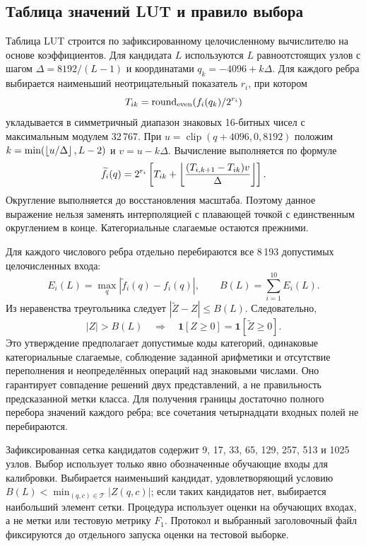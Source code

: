 \subsection{Таблица значений LUT и правило выбора}
\label{sec:lut}
Таблица LUT строится по зафиксированному целочисленному вычислителю на основе коэффициентов. Для кандидата $L$ используются $L$ равноотстоящих узлов с шагом $\Delta=8192/(L-1)$ и координатами $q_k=-4096+k\Delta$. Для каждого ребра выбирается наименьший неотрицательный показатель $r_i$, при котором
\begin{equation}
T_{ik}=\operatorname{round}_{\rm even}(f_i(q_k)/2^{r_i})
\end{equation}
укладывается в симметричный диапазон знаковых 16-битных чисел с максимальным модулем 32\,767. При $u=\operatorname{clip}(q+4096,0,8192)$ положим $k=\min(\left\lfloor u/\Delta\right\rfloor,L-2)$ и $v=u-k\Delta$. Вычисление выполняется по формуле
\begin{equation}
\widetilde f_i(q)=2^{r_i}\left[T_{ik}+\left\lfloor \frac{(T_{i,k+1}-T_{ik})v}{\Delta}\right\rfloor\right].
\label{eq:lut}
\end{equation}
Округление выполняется до восстановления масштаба. Поэтому данное выражение нельзя заменять интерполяцией с плавающей точкой с единственным округлением в конце. Категориальные слагаемые остаются прежними.

Для каждого числового ребра отдельно перебираются все 8\,193 допустимых целочисленных входа:
\begin{equation}
E_i(L)=\max_q|\widetilde f_i(q)-f_i(q)|,\qquad
B(L)=\sum_{i=1}^{10}E_i(L).
\end{equation}
Из неравенства треугольника следует $|\widetilde Z-Z|\leq B(L)$. Следовательно,
\begin{equation}
|Z|>B(L)\quad\Longrightarrow\quad
\mathbf1[Z\geq0]=\mathbf1[\widetilde Z\geq0].
\label{eq:certificate}
\end{equation}
Это утверждение предполагает допустимые коды категорий, одинаковые категориальные слагаемые, соблюдение заданной арифметики и отсутствие переполнения и неопределённых операций над знаковыми числами. Оно гарантирует совпадение решений двух представлений, а не правильность предсказанной метки класса. Для получения границы достаточно полного перебора значений каждого ребра; все сочетания четырнадцати входных полей не перебираются.

Зафиксированная сетка кандидатов содержит 9, 17, 33, 65, 129, 257, 513 и 1025 узлов. Выбор использует только явно обозначенные обучающие входы для калибровки. Выбирается наименьший кандидат, удовлетворяющий условию $B(L)<\min_{(q,c)\in\mathcal T}|Z(q,c)|$; если таких кандидатов нет, выбирается наибольший элемент сетки. Процедура использует оценки на обучающих входах, а не метки или тестовую метрику $F_1$. Протокол и выбранный заголовочный файл фиксируются до отдельного запуска оценки на тестовой выборке.

